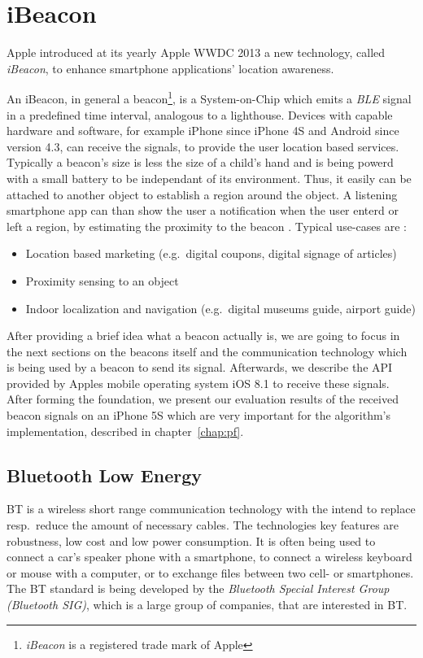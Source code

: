 \chapter{iBeacon} \label{chap:ibeacons}
Apple introduced at its yearly Apple \ac{WWDC} 2013 a new technology, called \textit{iBeacon}, to enhance smartphone applications' location awareness.

An iBeacon, in general a beacon\footnote{\textit{iBeacon} is a registered trade mark of Apple}, is a System-on-Chip which emits a \textit{\ac{BLE}} signal in a predefined time interval, analogous to a lighthouse. %
Devices with capable hardware and software, for example iPhone since iPhone 4S and Android since version 4.3, can receive the signals, to provide the user location based services.
Typically a beacon's size is less the size of a child's hand and is being powerd with a small battery to be independant of its environment.
Thus, it easily can be attached to another object to establish a region around the object.
A listening smartphone app can than show the user a notification when the user enterd or left a region, by estimating the proximity to the beacon \cite{apple:getting_started, binside:ds}.
Typical use-cases are \cite{binside:ds}:
\begin{itemize}
  \item Location based marketing (e.g.\ digital coupons, digital signage of articles)
  \item Proximity sensing to an object
  \item Indoor localization and navigation (e.g.\ digital museums guide, airport guide)
\end{itemize}

After providing a brief idea what a beacon actually is, we are going to focus in the next sections on the beacons itself and the communication technology which is being used by a beacon to send its signal.
Afterwards, we describe the \acs{API} provided by Apples mobile operating system iOS 8.1 to receive these signals.
After forming the foundation, we present our evaluation results of the received beacon signals on an iPhone 5S which are very important for the algorithm's implementation, described in chapter~\ref{chap:pf}.


\section{Bluetooth Low Energy}\label{sec:ble}
\ac{BT} is a wireless short range communication technology with the intend to replace resp.\ reduce the amount of necessary cables. The technologies key features are robustness, low cost and low power consumption.
It is often being used to connect a car's speaker phone with a smartphone, to connect a wireless keyboard or mouse with a computer, or to exchange files between two cell- or smartphones.
The \acl{BT} standard is being developed by the \emph{Bluetooth Special Interest Group (Bluetooth SIG)}, which is a large group of companies, that are interested in \acs{BT}.

